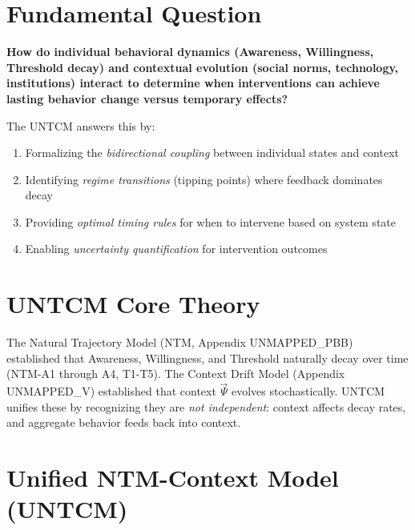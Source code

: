 \section{Fundamental Question}
\label{sec:untcm-fundamental}

\begin{tcolorbox}[colback=red!5!white,colframe=red!75!black,title=Fundamental Question]
\textbf{How do individual behavioral dynamics (Awareness, Willingness, Threshold decay) and contextual evolution (social norms, technology, institutions) interact to determine when interventions can achieve lasting behavior change versus temporary effects?}
\end{tcolorbox}

The UNTCM answers this by:
\begin{enumerate}[nosep]
    \item Formalizing the \emph{bidirectional coupling} between individual states and context
    \item Identifying \emph{regime transitions} (tipping points) where feedback dominates decay
    \item Providing \emph{optimal timing rules} for when to intervene based on system state
    \item Enabling \emph{uncertainty quantification} for intervention outcomes
\end{enumerate}

\section{UNTCM Core Theory}
\label{sec:untcm-core}

The Natural Trajectory Model (NTM, Appendix UNMAPPED_PBB) established that Awareness, Willingness, and Threshold naturally decay over time (NTM-A1 through A4, T1-T5). The Context Drift Model (Appendix UNMAPPED_V) established that context $\vec{\Psi}$ evolves stochastically. UNTCM unifies these by recognizing they are \emph{not independent}: context affects decay rates, and aggregate behavior feeds back into context.


\section{Unified NTM-Context Model (UNTCM)}
\label{sec:untcm}

